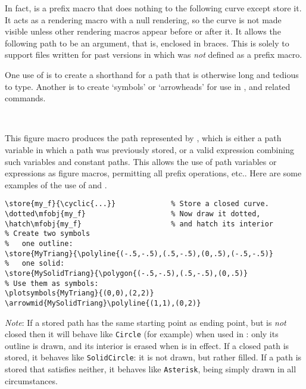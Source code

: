 \documentclass[letterpaper]{article}
\begin{document}
In fact,  is a prefix macro that does nothing to the following
curve except store it. It acts as a rendering macro with a null
rendering, so the curve is not made visible unless other rendering
macros appear before or after it. It allows the following path to be an
argument, that is, enclosed in braces. This is solely to support files
written for past \mfp{} versions in which  was \emph{not}
defined as a prefix macro.

One use of  is to create a shorthand for a path that is
otherwise long and tedious to type. Another is to create `symbols' or
`arrowheads' for use in ,  and related
commands.

\begin{cd}
\\
%
%
\end{cd}

This figure macro produces the path represented by , which is either a path variable in which a path was
previously stored, or a valid \MF{} expression combining such variables
and constant paths. This allows the use of path variables or
expressions as figure macros, permitting all prefix operations, etc..
Here are some examples of the use of  and .

\nobreak
\begin{verbatim}
\store{my_f}{\cyclic{...}}             % Store a closed curve.
\dotted\mfobj{my_f}                    % Now draw it dotted,
\hatch\mfobj{my_f}                     % and hatch its interior
% Create two symbols
%   one outline:
\store{MyTriang}{\polyline{(-.5,-.5),(.5,-.5),(0,.5),(-.5,-.5)}
%   one solid:
\store{MySolidTriang}{\polygon{(-.5,-.5),(.5,-.5),(0,.5)}
% Use them as symbols:
\plotsymbols{MyTriang}{(0,0),(2,2)}
\arrowmid{MySolidTriang}\polyline{(1,1),(0,2)}
\end{verbatim}

\emph{Note}: If a stored path has the same starting point as ending
point, but is \emph{not} closed then it will behave like \texttt{Circle}
(for example) when used in : only its outline is drawn,
and its interior is erased when  is in effect. If a
closed path is stored, it behaves like \texttt{SolidCircle}: it is not
drawn, but rather filled. If a path is stored that satisfies neither, it
behaves like \texttt{Asterisk}, being simply drawn in all circumstances.
\end{document}
